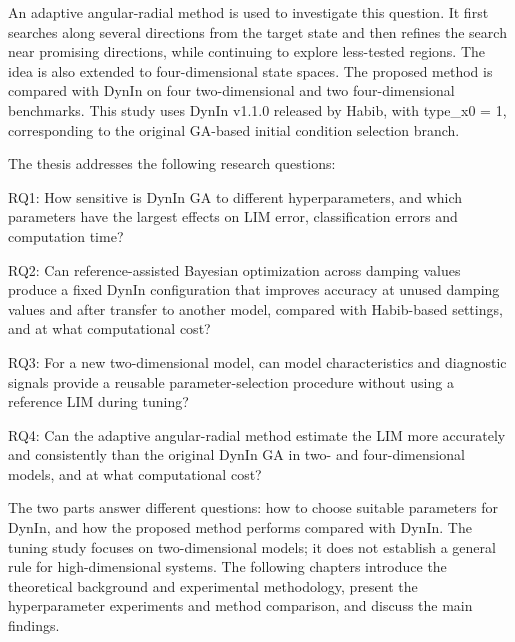 \begin{revision}
An adaptive angular-radial method is used to investigate this question. It first searches along several directions from the target state and then refines the search near promising directions, while continuing to explore less-tested regions. The idea is also extended to four-dimensional state spaces. The proposed method is compared with DynIn on four two-dimensional and two four-dimensional benchmarks. This study uses DynIn v1.1.0 released by Habib, with type\_x0 = 1, corresponding to the original GA-based initial condition selection branch.
\end{revision}

The thesis addresses the following research questions:

RQ1: How sensitive is DynIn GA to different hyperparameters, and which parameters have the largest effects on LIM error, classification errors and computation time?

\begin{bluerevision}
RQ2: Can reference-assisted Bayesian optimization across damping values produce a fixed DynIn configuration that improves accuracy at unused damping values and after transfer to another model, compared with Habib-based settings, and at what computational cost?
\end{bluerevision}

RQ3: For a new two-dimensional model, can model characteristics and diagnostic signals provide a reusable parameter-selection procedure without using a reference LIM during tuning?

RQ4: Can the adaptive angular-radial method estimate the LIM more accurately and consistently than the original DynIn GA in two- and four-dimensional models, and at what computational cost?

The two parts answer different questions: how to choose suitable parameters for DynIn, and how the proposed method performs compared with DynIn. The tuning study focuses on two-dimensional models; it does not establish a general rule for high-dimensional systems. The following chapters introduce the theoretical background and experimental methodology, present the hyperparameter experiments and method comparison, and discuss the main findings.
